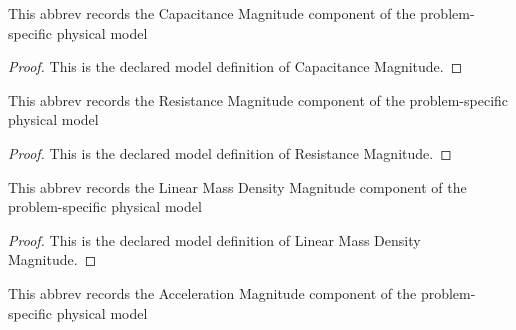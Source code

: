 \begin{definition}
  \label{def:physics:phyx-mini-0971:phyxminiproblems-problemphyxmini0971-capacitancemagnitude}
  This abbrev records the Capacitance Magnitude component of the problem-specific physical model
\end{definition}
\begin{proof}
  This is the declared model definition of Capacitance Magnitude.
\end{proof}
\begin{definition}
  \label{def:physics:phyx-mini-0971:phyxminiproblems-problemphyxmini0971-resistancemagnitude}
  This abbrev records the Resistance Magnitude component of the problem-specific physical model
\end{definition}
\begin{proof}
  This is the declared model definition of Resistance Magnitude.
\end{proof}
\begin{definition}
  \label{def:physics:phyx-mini-0971:phyxminiproblems-problemphyxmini0971-linearmassdensitymagnitude}
  This abbrev records the Linear Mass Density Magnitude component of the problem-specific physical model
\end{definition}
\begin{proof}
  This is the declared model definition of Linear Mass Density Magnitude.
\end{proof}
\begin{definition}
  \label{def:physics:phyx-mini-0971:phyxminiproblems-problemphyxmini0971-accelerationmagnitude}
  This abbrev records the Acceleration Magnitude component of the problem-specific physical model
\end{definition}
